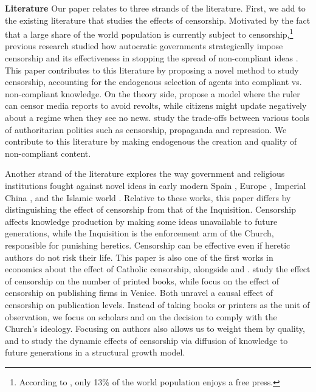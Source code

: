 \textbf{Literature} Our paper relates to three strands of the literature. First, we add to the existing literature that studies the effects of censorship. Motivated by the fact that a large share of the world population is currently subject to censorship,\footnote{According to , only 13\% of the world population enjoys a free press.}  previous research studied how autocratic governments strategically impose censorship \cite{king2013,zhuang2019} and its effectiveness in stopping the spread of non-compliant ideas \cite{roberts2014}. This paper contributes to this literature by proposing a novel method to study censorship, accounting for the endogenous selection of agents into compliant vs. non-compliant knowledge. On the theory side,  propose a model where the ruler can censor media reports to avoid revolts, while citizens might update negatively about a regime when they see no news.  study the trade-offs between various tools of authoritarian politics such as censorship, propaganda and repression. We contribute to this literature by making endogenous the creation and quality of non-compliant content.

Another strand of the literature explores the way government and religious institutions fought against novel ideas in early modern Spain \cite{vidal2011,drelichman2021}, Europe \cite{anderson2015,galbiati22,cabello2022}, Imperial China \cite{koyama2015}, and the Islamic world \cite{iyigun2015,chaney2016,rubin2017}. Relative to these works, this paper differs by distinguishing the effect of censorship from that of the Inquisition. Censorship affects knowledge production by making some ideas unavailable to future generations, while the Inquisition is the enforcement arm of the Church, responsible for punishing heretics. Censorship can be effective even if heretic authors do not risk their life. This paper is also one of the first works in economics about the effect of Catholic censorship, alongside  and .  study the effect of censorship on the number of printed books, while  focus on the effect of censorship on publishing firms in Venice. Both unravel a causal effect of censorship on publication levels. Instead of taking books or printers as the unit of observation, we focus on scholars and on the decision to comply with the Church's ideology. Focusing on authors also allows us to weight them by quality, and to study the dynamic effects of censorship via diffusion of knowledge to future generations in a structural growth model.

